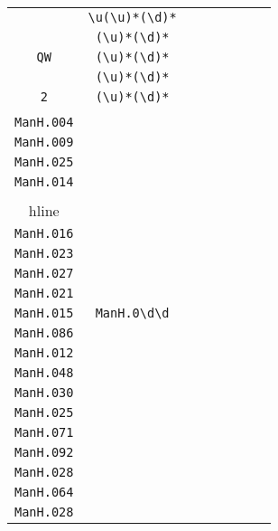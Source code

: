 \begin{longtable}{cccccccc}
\begin{tabular}{ll}
    \verb|LLYA7| & \verb|\u(\u)*(\d)*|\\
\verb|| & \verb|(\u)*(\d)*|\\
\verb|QW| & \verb|(\u)*(\d)*|\\
\verb|| & \verb|(\u)*(\d)*|\\
\verb|2| & \verb|(\u)*(\d)*|
\end{tabular}
\\\midrule 
\begin{tabular}{l}
    \verb|ManH.010|\\
\verb|ManH.004|\\
\verb|ManH.009|\\
\verb|ManH.025|\\
\verb|ManH.014|\\
\\hline\\
\verb|ManH.016|\\
\verb|ManH.023|\\
\verb|ManH.027|\\
\verb|ManH.021|\\
\verb|ManH.015|
\end{tabular}

&
\verb|ManH.0\d\d|
&

\begin{tabular}{l}
    \verb|ManH\.0\d\d|\\
\verb|ManH.086|\\
\verb|ManH.012|\\
\verb|ManH.048|\\
\verb|ManH.030|\\
\verb|ManH.025|
\end{tabular}

&

\begin{tabular}{l}
    \verb|ManH\.0\d\d|\\
\verb|ManH.071|\\
\verb|ManH.092|\\
\verb|ManH.028|\\
\verb|ManH.064|\\
\verb|ManH.028|
\end{tabular}

&


\end{longtable}

